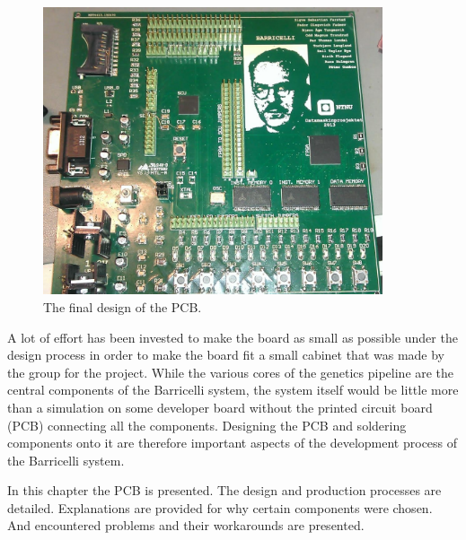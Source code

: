 \begin{figure}[H]
\centering
\includegraphics[width=10cm,keepaspectratio]{pcb/thewholeboard.jpg}
\caption{The final design of the PCB.  }
\label{figure:thewholeboard}
\end{figure}
A lot of effort has been invested to make the board as small as possible under the design process in order to make the board fit a small cabinet that was made by the group for the project.
While the various cores of the genetics pipeline are the central components of the Barricelli system, the system itself would be little more than a simulation on some developer board without the printed circuit board (PCB) connecting all the components.
Designing the PCB and soldering components onto it are therefore important aspects of the development process of the Barricelli system.

In this chapter the PCB is presented.
The design and production processes are detailed.
Explanations are provided for why certain components were chosen.
And encountered problems and their workarounds are presented.

 \label{pcb:section:design_choices}

 \label{pcb:section:power_supply}

 \label{pcb:section:power_plane}

 \label{pcb:section:footprints}

 \label{pcb:section:budget}

 \label{pcb:section:process}

 \label{pcb:section:problems_and_workaround}

